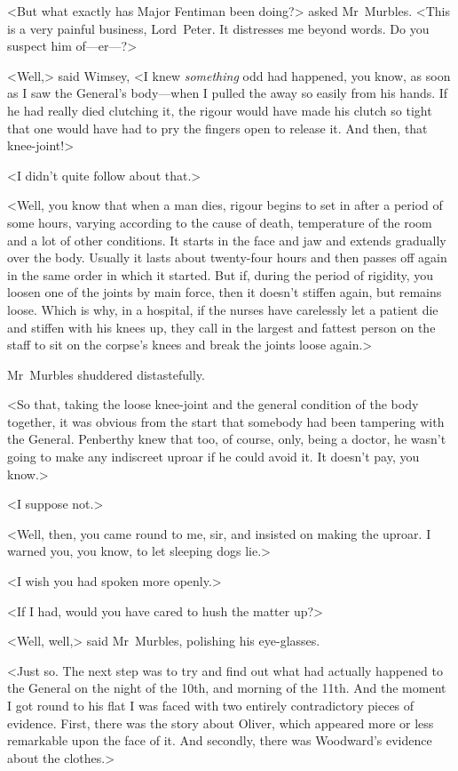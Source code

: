 <But what exactly has Major Fentiman been doing?> asked Mr~Murbles. <This is a very painful business, Lord~Peter. It distresses me beyond words. Do you suspect him of—er—?>

<Well,> said Wimsey, <I knew \emph{something} odd had happened, you know, as soon as I saw the General's body—when I pulled the  away so easily from his hands. If he had really died clutching it, the rigour would have made his clutch so tight that one would have had to pry the fingers open to release it. And then, that knee-joint!>

<I didn't quite follow about that.>

<Well, you know that when a man dies, rigour begins to set in after a period of some hours, varying according to the cause of death, temperature of the room and a lot of other conditions. It starts in the face and jaw and extends gradually over the body. Usually it lasts about twenty-four hours and then passes off again in the same order in which it started. But if, during the period of rigidity, you loosen one of the joints by main force, then it doesn't stiffen again, but remains loose. Which is why, in a hospital, if the nurses have carelessly let a patient die and stiffen with his knees up, they call in the largest and fattest person on the staff to sit on the corpse's knees and break the joints loose again.>

Mr~Murbles shuddered distastefully.

<So that, taking the loose knee-joint and the general condition of the body together, it was obvious from the start that somebody had been tampering with the General. Penberthy knew that too, of course, only, being a doctor, he wasn't going to make any indiscreet uproar if he could avoid it. It doesn't pay, you know.>

<I suppose not.>

<Well, then, you came round to me, sir, and insisted on making the uproar. I warned you, you know, to let sleeping dogs lie.>

<I wish you had spoken more openly.>

<If I had, would you have cared to hush the matter up?>

<Well, well,> said Mr~Murbles, polishing his eye-glasses.

<Just so. The next step was to try and find out what had actually happened to the General on the night of the  10th, and morning of the 11th. And the moment I got round to his flat I was faced with two entirely contradictory pieces of evidence. First, there was the story about Oliver, which appeared more or less remarkable upon the face of it. And secondly, there was Woodward's evidence about the clothes.>

